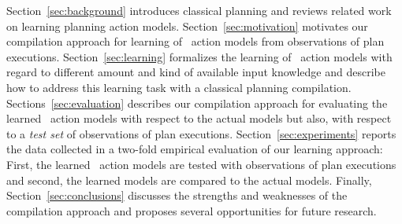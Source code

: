 Section~\ref{sec:background} introduces classical planning and reviews related work on learning planning action models. Section~\ref{sec:motivation} motivates our compilation approach for learning of \strips\ action models from observations of plan executions. Section~\ref{sec:learning} formalizes the learning of \strips\ action models with regard to different amount and kind of available input knowledge and describe how to address this learning task with a classical planning compilation. Sections~\ref{sec:evaluation} describes our compilation approach for evaluating the learned \strips\ action models with respect to the actual models but also, with respect to a {\em test set} of observations of plan executions. Section~\ref{sec:experiments} reports the data collected in a two-fold empirical evaluation of our learning approach: First, the learned \strips\ action models are tested with observations of plan executions and second, the learned models are compared to the actual models. Finally, Section~\ref{sec:conclusions} discusses the strengths and weaknesses of the compilation approach and proposes several opportunities for future research.

 
